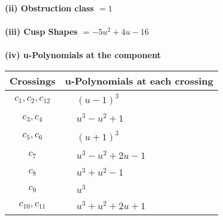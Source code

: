 \documentclass[1p]{elsarticle_modified}
\theoremstyle{definition}
\begin{document}
\flushleft \textbf{(ii) Obstruction class $= 1$}\\~\\
\flushleft \textbf{(iii) Cusp Shapes $= -5 u^2+4 u-16$}\\~\\
\newpage\renewcommand{\arraystretch}{1}
\flushleft \textbf{(iv) u-Polynomials at the component}\newline \\
\begin{tabular}{m{50pt}|m{274pt}}
Crossings & \hspace{64pt}u-Polynomials at each crossing \\
\hline $$\begin{aligned}c_{1},c_{2},c_{12}\end{aligned}$$&$\begin{aligned}
&(u-1)^3
\end{aligned}$\\
\hline $$\begin{aligned}c_{3},c_{4}\end{aligned}$$&$\begin{aligned}
&u^3- u^2+1
\end{aligned}$\\
\hline $$\begin{aligned}c_{5},c_{6}\end{aligned}$$&$\begin{aligned}
&(u+1)^3
\end{aligned}$\\
\hline $$\begin{aligned}c_{7}\end{aligned}$$&$\begin{aligned}
&u^3- u^2+2 u-1
\end{aligned}$\\
\hline $$\begin{aligned}c_{8}\end{aligned}$$&$\begin{aligned}
&u^3+u^2-1
\end{aligned}$\\
\hline $$\begin{aligned}c_{9}\end{aligned}$$&$\begin{aligned}
&u^3
\end{aligned}$\\
\hline $$\begin{aligned}c_{10},c_{11}\end{aligned}$$&$\begin{aligned}
&u^3+u^2+2 u+1
\end{aligned}$\\
\hline
\end{tabular}\\~\\
\end{document}
